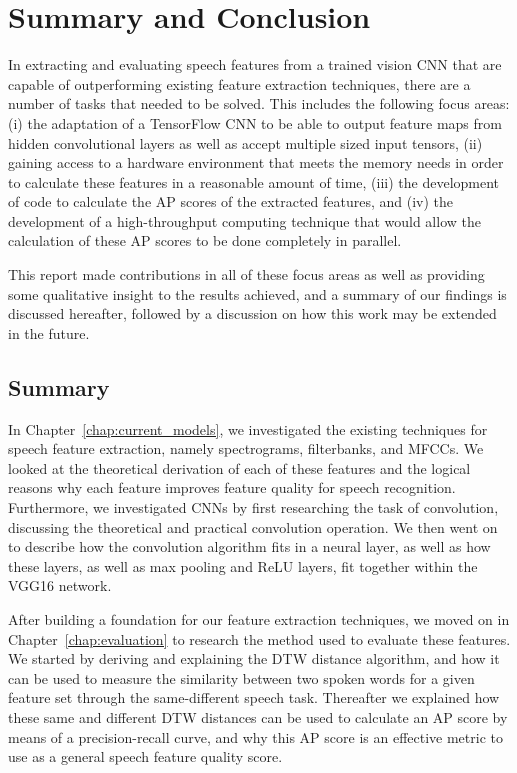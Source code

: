 \graphicspath{{conclusion/fig/}}

\chapter{Summary and Conclusion}

In extracting and evaluating speech features from a trained vision CNN that are capable of outperforming existing feature extraction techniques, there are a number of tasks that needed to be solved.
This includes the following focus areas: (i) the adaptation of a TensorFlow CNN to be able to output feature maps from hidden convolutional layers as well as accept multiple sized input tensors, (ii) gaining access to a hardware environment that meets the memory needs in order to calculate these features in a reasonable amount of time, (iii) the development of code to calculate the AP scores of the extracted features, and (iv) the development of a high-throughput computing technique that would allow the calculation of these AP scores to be done completely in parallel.

This report made contributions in all of these focus areas as well as providing some qualitative insight to the results achieved, and a summary of our findings is discussed hereafter, followed by a discussion on how this work may be extended in the future.

\section{Summary}

In Chapter~\ref{chap:current_models}, we investigated the existing techniques for speech feature extraction, namely spectrograms, filterbanks, and MFCCs. 
We looked at the theoretical derivation of each of these features and the logical reasons why each feature improves feature quality for speech recognition.
Furthermore, we investigated CNNs by first researching the task of convolution, discussing the theoretical and practical convolution operation.
We then went on to describe how the convolution algorithm fits in a neural layer, as well as how these layers, as well as max pooling and ReLU layers, fit together within the VGG16 network.

After building a foundation for our feature extraction techniques, we moved on in Chapter~\ref{chap:evaluation} to research the method used to evaluate these features.
We started by deriving and explaining the DTW distance algorithm, and how it can be used to measure the similarity between two spoken words for a given feature set through the same-different speech task.
Thereafter we explained how these same and different DTW distances can be used to calculate an AP score by means of a precision-recall curve, and why this AP score is an effective metric to use as a general speech feature quality score.

